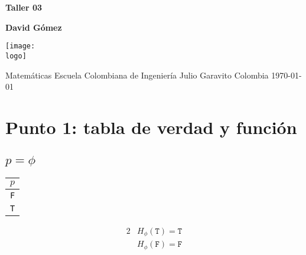 \documentclass{article}
\newcommand{\logo}{C:/Users/usuario/Documents/U/logo-eci.jpg}
\begin{document}
\begin{titlepage}
    \begin{center}
        \vspace*{1cm}

        \textbf{\Huge{Taller 03}}

        \vspace{1.5cm}

        \textbf{\large{David Gómez}}

        \vspace{4cm}

        \texttt{[image: \\logo]}

        \vspace{5cm}

        Matemáticas\linebreak
        Escuela Colombiana de Ingeniería Julio Garavito\linebreak
        Colombia\linebreak
        \today

    \end{center}
\end{titlepage}
\clearpage
\tableofcontents
\clearpage

\section{Punto 1: tabla de verdad y función}
\subsection{$p = \phi$}
\begin{center}
    \begin{NiceTabular}{|c|}
        \hline
        $p$\\
        \hline
        \texttt{F}\\
        \texttt{T}\\
        \hline
    \end{NiceTabular}
\end{center}
\begin{alignat*}{2}
    &H_{\phi}(\mathtt{T}) = \mathtt{T}\\
    &H_{\phi}(\mathtt{F}) = \mathtt{F}
\end{alignat*}
\end{document}
